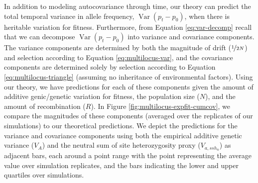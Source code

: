 \documentclass[11pt]{article}
\newcommand{\vb}[1]{{\it \color{blue} #1}}
\DeclareMathOperator{\var}{Var}
\begin{document}

In addition to modeling autocovariance through time, our theory can predict the
total temporal variance in allele frequency, $\var(p_t - p_0)$, when there is
heritable variation for fitness. Furthermore, from Equation
\eqref{eq:var-decomp} recall that we can decompose $\var(p_t - p_0)$ into
variance and covariance components. The variance components are determined by
both the magnitude of drift ($\nicefrac{1}{2N}$) and selection according to
Equation \eqref{eq:multilocus-var}, and the covariance components are
determined solely by selection according to Equation
\eqref{eq:multilocus-triangle} (assuming no inheritance of environmental
factors). Using our theory, we have predictions for each of these components
given the amount of additive genic/genetic variation for fitness, the
population size ($N$), and the amount of recombination ($R$). In Figure
\ref{fig:multilocus-expfit-cumcov}, we compare the magnitudes of these
components (averaged over the replicates of our simulations) to our theoretical
predictions. We depict the predictions for the variance and covariance
components using both the empirical additive genetic variance ($V_A$) and the
neutral sum of site heterozygosity proxy ($V_{a,ssh_n}$) as adjacent bars, each
around a point range with the point representing the average value over
simulation replicates, and the bars indicating the lower and upper quartiles
over simulations. 
\end{document}
